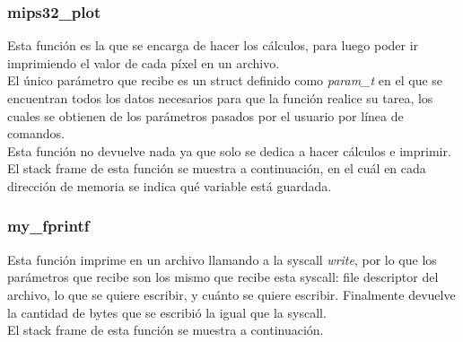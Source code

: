 \documentclass[a4paper,10pt]{article}
\begin{document}
\subsubsection{mips32\_plot}
Esta función es la que se encarga de hacer los cálculos, para luego poder ir imprimiendo el valor de cada píxel en un archivo. \\
El único parámetro que recibe es un struct definido como \textit{param\_t} en el que se encuentran todos los datos necesarios para que la función realice su tarea, los cuales se obtienen de los parámetros pasados por el usuario por línea de comandos. \\
Esta función no devuelve nada ya que solo se dedica a hacer cálculos e imprimir. \\
El stack frame de esta función se muestra a continuación, en el cuál en cada dirección de memoria se indica qué variable está guardada.

\begin{center}
\begin{drawstack}
	\startframe
	 
	 
	 
	 
	\startframe
	 
	 
	 
	 
	\startframe
	 
	 
	 
	 
	\startframe
	 
	 
	 
	 
\end{drawstack}
\end{center}

\subsubsection{my\_fprintf}
Esta función imprime en un archivo llamando a la syscall \textit{write}, por lo que los parámetros que recibe son los mismo que recibe esta syscall: file descriptor del archivo, lo que se quiere escribir, y cuánto se quiere escribir. Finalmente devuelve la cantidad de bytes que se escribió la igual que la syscall. \\
El stack frame de esta función se muestra a continuación.

\begin{center}
\begin{drawstack}
	\startframe
	 
	 
	 
	 
	\startframe
	 
	 
	\startframe
	 
	 
	 
	 
\end{drawstack}
\end{center}
\end{document}

